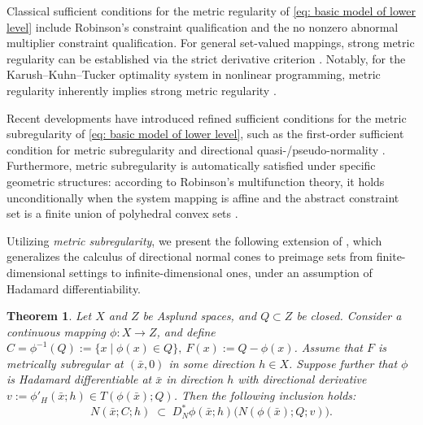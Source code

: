 \documentclass[12pt,twoside,reqno]{amsart}
\newtheorem{theorem}{Theorem}[section]
\theoremstyle{definition}
\numberwithin{equation}{section}
\begin{document}
Classical sufficient conditions for the metric regularity of \eqref{eq: basic model of lower level} include Robinson's constraint qualification and the no nonzero abnormal multiplier constraint qualification. For general set-valued mappings, strong metric regularity can be established via the strict derivative criterion \cite[Theorem 4D.1]{dontchev2009implicit}. Notably, for the Karush--Kuhn--Tucker optimality system in nonlinear programming, metric regularity inherently implies strong metric regularity \cite[Section 4H]{dontchev2009implicit}. 

Recent developments have introduced refined sufficient conditions for the metric subregularity of \eqref{eq: basic model of lower level}, such as the first-order sufficient condition for metric subregularity and directional quasi-/pseudo-normality \cite{bai2019directional}. Furthermore, metric subregularity is automatically satisfied under specific geometric structures: according to Robinson's multifunction theory, it holds unconditionally when the system mapping is affine and the abstract constraint set is a finite union of polyhedral convex sets \cite{robinson1981some, bai2019directional}.

Utilizing \emph{metric subregularity}, we present the following extension of \cite[Theorem~3.1]{benko2019calculus}, which generalizes the calculus of directional normal cones to preimage sets from finite-dimensional settings to infinite-dimensional ones, under an assumption of Hadamard differentiability.

\begin{theorem}\label{thm: directional normal cones of preimage sets} 
Let \( X \) and \( Z \) be Asplund spaces, and \( Q \subset Z \) be closed.  
Consider a continuous mapping \( \phi : X \to Z \), and define
$C = \phi^{-1}(Q):= \{x\mid \phi(x)\in Q\}, ~F(x) := Q - \phi(x)$. 
Assume that \( F \) is metrically subregular at \( (\bar{x}, 0) \) in some direction \( h \in X \).  
Suppose further that \( \phi \) is Hadamard differentiable at \(\bar{x}\) in direction \( h \) with directional derivative $v := \phi'_H(\bar{x}; h)\in T(\phi(\bar x);Q)$. Then the following inclusion holds:
\begin{equation}\label{eq:dir_normal_preimage}
    N(\bar{x}; C; h) \;\subset\; D^*_N \phi(\bar{x}; h) \big( N(\phi(\bar{x}); Q; v) \big).
\end{equation}
\end{theorem}
\end{document}
